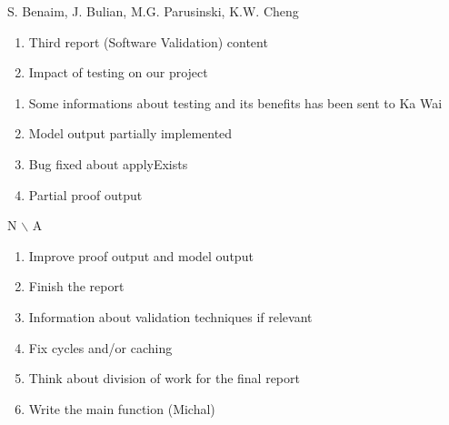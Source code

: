 %
{S. Benaim, J. Bulian, M.G. Parusinski, K.W. Cheng}%
{\begin{enumerate}
\item Third report (Software Validation) content
\item Impact of testing on our project
\end{enumerate}
}%
{\begin{enumerate}
\item Some informations about testing and its benefits has been sent to Ka Wai
\item Model output partially implemented
\item Bug fixed about applyExists
\item Partial proof output
\end{enumerate}
}%
{
{N $\backslash$ A}
}
{\begin{enumerate}
\item Improve proof output and model output
\item Finish the report
\item Information about validation techniques if relevant
\item Fix cycles and/or caching
\item Think about division of work for the final report
\item Write the main function (Michal)
\end{enumerate}}%

